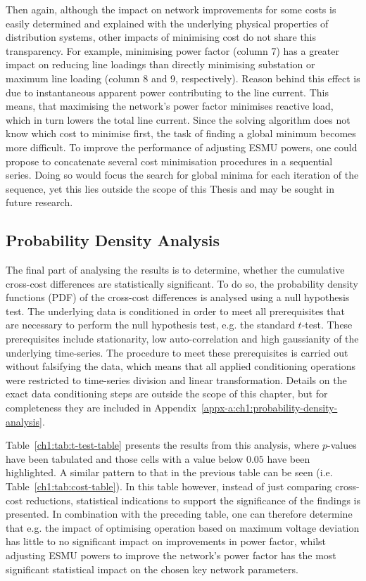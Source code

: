 Then again, although the impact on network improvements for some costs is easily determined and explained with the underlying physical properties of distribution systems, other impacts of minimising cost do not share this transparency.
For example, minimising power factor (column 7) has a greater impact on reducing line loadings than directly minimising substation or maximum line loading (column 8 and 9, respectively).
Reason behind this effect is due to instantaneous apparent power contributing to the line current.
This means, that maximising the network's power factor minimises reactive load, which in turn lowers the total line current.
Since the solving algorithm does not know which cost to minimise first, the task of finding a global minimum becomes more difficult.
To improve the performance of adjusting ESMU powers, one could propose to concatenate several cost minimisation procedures in a sequential series.
Doing so would focus the search for global minima for each iteration of the sequence, yet this lies outside the scope of this Thesis and may be sought in future research.

\subsection{Probability Density Analysis}
\label{ch1:subsec:probability-density-analysis}

The final part of analysing the results is to determine, whether the cumulative cross-cost differences are statistically significant.
To do so, the probability density functions (PDF) of the cross-cost differences is analysed using a null hypothesis test.
The underlying data is conditioned in order to meet all prerequisites that are necessary to perform the null hypothesis test, e.g. the standard $t$-test.
These prerequisites include stationarity, low auto-correlation and high gaussianity of the underlying time-series.
The procedure to meet these prerequisites is carried out without falsifying the data, which means that all applied conditioning operations were restricted to time-series division and linear transformation.
Details on the exact data conditioning steps are outside the scope of this chapter, but for completeness they are included in Appendix~\ref{appx-a:ch1:probability-density-analysis}.



Table~\ref{ch1:tab:t-test-table} presents the results from this analysis, where $p$-values have been tabulated and those cells with a value below $0.05$ have been highlighted.
A similar pattern to that in the previous table can be seen (i.e. Table~\ref{ch1:tab:cost-table}).
In this table however, instead of just comparing cross-cost reductions, statistical indications to support the significance of the findings is presented.
In combination with the preceding table, one can therefore determine that e.g. the impact of optimising operation based on maximum voltage deviation has little to no significant impact on improvements in power factor, whilst adjusting ESMU powers to improve the network's power factor has the most significant statistical impact on the chosen key network parameters.